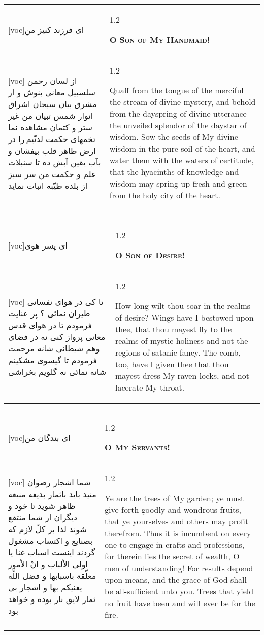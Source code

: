 \documentclass[11pt]{article}
\makeatletter
\newenvironment{orig}
  {\begin{farsi}[voc]}
  {\end{farsi}}
\newenvironment{trans}
  {\Large\begin{spacing}{1.2}\raggedright}
  {\end{spacing}}
\newenvironment{word}
  {\begin{tabular}[t]{p{2.75in}@{\hspace{3em}}p{2.75in}}}
  {\end{tabular}}
\newcommand{\ayat}[2]{\begin{orig}#1\end{orig} & \begin{trans}#2\end{trans}}
\newcommand{\heading}[2]{\textsc{\textbf{#1}} %
}
\makeatother
\begin{document}
\pagebreak

\begin{word}
\ayat{ای فرزند کنيز من}{\heading{O Son of My Handmaid!}{}} \\ \ayat{
از لسان رحمن سلسبيل معانی بنوش و از مشرق بيان سبحان اشراق انوار شمس تبيان من غير ستر و کتمان مشاهده نما
تخمهای حکمت لدنّيم را در ارض طاهر قلب بيفشان و بآب يقين آبش ده تا سنبلات علم و حکمت من سر سبز از بلده طيّبه انبات نمايد
}{
  Quaff from the tongue of the merciful the stream of divine mystery, and
  behold from the dayspring of divine utterance the unveiled splendor of the
  daystar of wisdom. Sow the seeds of My divine wisdom in the pure soil of the
  heart, and water them with the waters of certitude, that the hyacinths of
  knowledge and wisdom may spring up fresh and green from the holy city of the
  heart.
}
\end{word}

\pagebreak

\begin{word}
\ayat{ای پسر هوی}{\heading{O Son of Desire!}{}} \\ \ayat{
تا کی در هوای نفسانی طيران نمائی ؟ پر عنايت فرمودم تا در هوای قدس معانی پرواز کنی نه در فضای وهم شيطانی
شانه مرحمت فرمودم تا گيسوی مشکينم شانه نمائی نه گلويم بخراشی
}{
  How long wilt thou soar in the realms of desire? Wings have I bestowed upon
  thee, that thou mayest fly to the realms of mystic holiness and not the
  regions of satanic fancy. The comb, too, have I given thee that thou mayest
  dress My raven locks, and not lacerate My throat.
}
\end{word}

\pagebreak

\begin{word}
\ayat{ای بندگان من}{\heading{O My Servants!}{}} \\ \ayat{
شما اشجار رضوان منيد بايد باثمار بديعه منيعه ظاهر شويد تا خود و ديگران از شما منتفع شوند
لذا بر کلّ لازم که بصنايع و اکتساب مشغول گردند
اينست اسباب غنا يا اولی الألباب و انّ الأمور معلّقة باسبابها و فضل اللّه يغنيکم بها
و اشجار بی ثمار لايق نار بوده و خواهد بود
}{
  Ye are the trees of My garden; ye must give forth goodly and wondrous
  fruits, that ye yourselves and others may profit therefrom. Thus it is
  incumbent on every one to engage in crafts and professions, for therein lies
  the secret of wealth, O men of understanding! For results depend upon means,
  and the grace of God shall be all-sufficient unto you. Trees that yield no
  fruit have been and will ever be for the fire.
}
\end{word}
\end{document}

